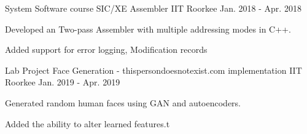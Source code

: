 \begin{cventries}


 \cventry
    {System Software course} %
    {SIC/XE Assembler} %
    {IIT Roorkee} %
    {Jan. 2018 - Apr. 2018} %
    {
      \begin{cvitems} %
        \item {Developed an Two-pass Assembler with multiple addressing modes in C++.}
        \item {Added support for error logging, Modification records}
      \end{cvitems}
    }

     \cventry
    {Lab Project} %
    {Face Generation - thispersondoesnotexist.com implementation} %
    {IIT Roorkee} %
    {Jan. 2019 - Apr. 2019} %
    {
      \begin{cvitems} %
        \item {Generated random human faces using GAN and autoencoders.}
        \item {Added the ability to alter learned features.t}
      \end{cvitems}
    }    

\end{cventries}
